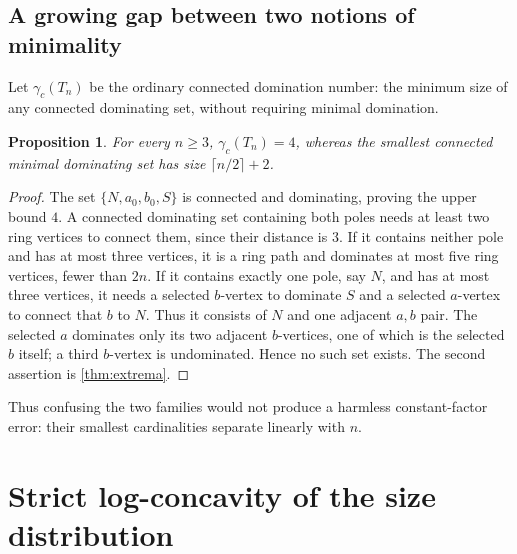 \documentclass[11pt,letterpaper]{article}
\numberwithin{equation}{section}
\newtheorem{proposition}[theorem]{Proposition}
\theoremstyle{definition}
\newcommand{\1}{\mathbf 1}
\begin{document}
\subsection{A growing gap between two notions of minimality}
Let $\gamma_c(T_n)$ be the ordinary connected domination number: the minimum
size of any connected dominating set, without requiring minimal domination.
\begin{proposition}\label{prop:gammac}
For every $n\ge3$, $\gamma_c(T_n)=4$, whereas the smallest connected minimal
dominating set has size $\lceil n/2\rceil+2$.
\end{proposition}
\begin{proof}
The set $\{N,a_0,b_0,S\}$ is connected and dominating, proving the upper bound $4$.
A connected dominating set containing both poles needs at least two ring
vertices to connect them, since their distance is $3$. If it contains neither
pole and has at most three vertices, it is a ring path and dominates at most
five ring vertices, fewer than $2n$. If it contains exactly one pole, say $N$,
and has at most three vertices, it needs a selected $b$-vertex to dominate $S$
and a selected $a$-vertex to connect that $b$ to $N$. Thus it consists of $N$
and one adjacent $a,b$ pair. The selected $a$ dominates only its two adjacent
$b$-vertices, one of which is the selected $b$ itself; a third $b$-vertex is
undominated. Hence no such set exists. The second assertion is
\cref{thm:extrema}.
\end{proof}
Thus confusing the two families would not produce a harmless constant-factor
error: their smallest cardinalities separate linearly with $n$.

\section{Strict log-concavity of the size distribution}\label{sec:logconcavity}
\end{document}
